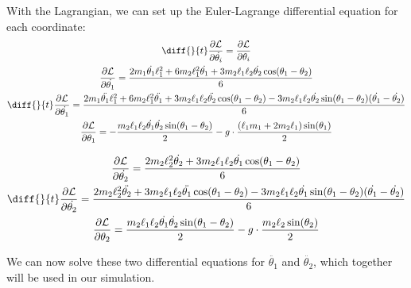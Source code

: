 \documentclass[]{article}
\begin{document}
With the Lagrangian, we can set up the Euler-Lagrange differential equation for each coordinate:
\begin{gather*}
	\diff{}{t}\frac{\partial \lagr}{\partial \dot{\theta_i}} = \frac{\partial \lagr}{\partial \theta_i} \\
	\frac{\partial \lagr}{\partial \dot{\theta_1}} = \frac{2m_1\dot{\theta_1}\ell_1^2 + 6m_2\ell_1^2\dot{\theta_1} + 3m_2\ell_1\ell_2\dot{\theta_2}\cos(\theta_1 - \theta_2)}{6} \\
	\diff{}{t}\frac{\partial \lagr}{\partial \dot{\theta_1}} =  \frac{2m_1\ddot{\theta_1}\ell_1^2 + 6m_2\ell_1^2\ddot{\theta_1} + 3m_2\ell_1\ell_2\ddot{\theta_2}\cos(\theta_1 - \theta_2) - 3m_2\ell_1\ell_2\dot{\theta_2}\sin(\theta_1 - \theta_2)(\dot{\theta_1} - \dot{\theta_2})}{6} \\
	\frac{\partial \lagr}{\partial \theta_1} = -\frac{m_2\ell_1\ell_2\dot{\theta_1}\dot{\theta_2}\sin(\theta_1 - \theta_2)}{2} - g\cdot\frac{(\ell_1m_1 + 2m_2\ell_1)\sin(\theta_1)}{2} \\
\end{gather*}

\begin{gather*}
	\frac{\partial \lagr}{\partial \dot{\theta_2}} = \frac{2m_2\ell_2^2\dot{\theta_2} + 3m_2\ell_1\ell_2\dot{\theta_1}\cos(\theta_1 - \theta_2)}{6} \\
	\diff{}{t}\frac{\partial \lagr}{\partial \dot{\theta_2}} = \frac{2m_2\ell_2^2\ddot{\theta_2} + 3m_2\ell_1\ell_2\ddot{\theta_1}\cos(\theta_1 - \theta_2) - 3m_2\ell_1\ell_2\dot{\theta_1}\sin(\theta_1 - \theta_2)(\dot{\theta_1} - \dot{\theta_2})}{6} \\
	\frac{\partial \lagr}{\partial \theta_2} = \frac{m_2\ell_1\ell_2\dot{\theta_1}\dot{\theta_2}\sin(\theta_1 - \theta_2)}{2} - g\cdot\frac{m_2\ell_2\sin(\theta_2)}{2}
\end{gather*}

We can now solve these two differential equations for $\ddot{\theta_1}$ and $\ddot{\theta_2}$, which together will be used in our simulation.
\end{document}
